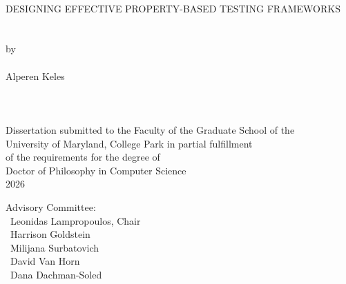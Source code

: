 
\thispagestyle{empty} \hbox{\ }
\vspace{.5in}

\renewcommand{\baselinestretch}{1}
\small\normalsize
\begin{center}

    \large{{DESIGNING EFFECTIVE PROPERTY-BASED TESTING FRAMEWORKS}}\\
    \ \\
    \ \\
    \large{by} \\
    \ \\
    \large{Alperen Keles}%
    \ \\
    \ \\
    \ \\
    \ \\
    \normalsize
    Dissertation submitted to the Faculty of the Graduate School of the \\
    University of Maryland, College Park in partial fulfillment \\
    of the requirements for the degree of \\
    Doctor of Philosophy in Computer Science \\
    2026
\end{center}

\vspace{7.5em}

\noindent Advisory Committee: \\
\hbox{\ }\hspace{.5in}Leonidas Lampropoulos, Chair \\
\hbox{\ }\hspace{.5in}Harrison Goldstein \\
\hbox{\ }\hspace{.5in}Milijana Surbatovich \\
\hbox{\ }\hspace{.5in}David Van Horn \\
\hbox{\ }\hspace{.5in}Dana Dachman-Soled
